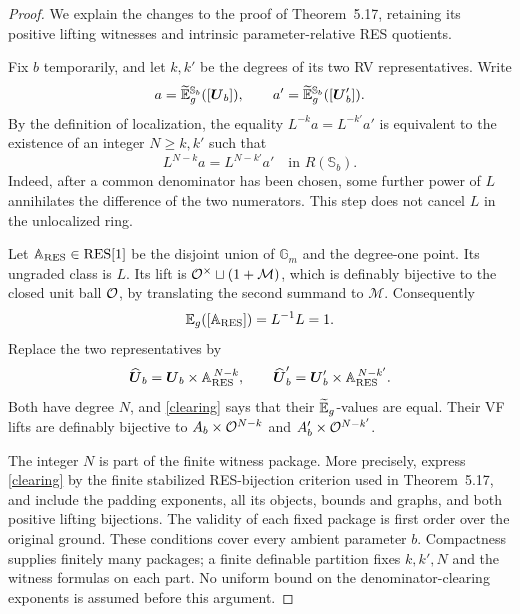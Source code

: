 \begin{proof}
We explain the changes to the proof of Theorem~5.17, retaining its
positive lifting witnesses and intrinsic parameter-relative RES quotients.

Fix $b$ temporarily, and let $k,k'$ be the degrees of its two RV
representatives. Write
\[
 a=\widetilde{\mathbb E}_g^{\mathbb S_b}([\boldsymbol{U}_b]),\qquad
 a'=\widetilde{\mathbb E}_g^{\mathbb S_b}([\boldsymbol{U}'_b]).
\]
By the definition of localization, the equality $L^{-k}a=L^{-k'}a'$
is equivalent to the existence of an integer $N\geq k,k'$ such that
\begin{equation}\label{clearing}
 L^{N-k}a=L^{N-k'}a'\quad\text{in }R(\mathbb S_b).
\end{equation}
Indeed, after a common denominator has been chosen, some further power
of $L$ annihilates the difference of the two numerators. This step does
not cancel $L$ in the unlocalized ring.

Let $\boldsymbol{\mathbb A}_{\mathrm{RES}}\in\mathrm{RES}[1]$ be the disjoint union of
$\mathbb G_m$ and the degree-one point. Its ungraded class is $L$.
Its lift is $\mathcal O^\times\sqcup(1+\mathcal M)$, which is definably
bijective to the closed unit ball $\mathcal O$, by translating the second
summand to $\mathcal M$. Consequently
\[
 \mathbb E_g([\boldsymbol{\mathbb A}_{\mathrm{RES}}])=L^{-1}L=1.
\]
Replace the two representatives by
\[
 \widehat{\boldsymbol{U}}_b=\boldsymbol{U}_b\times\boldsymbol{\mathbb A}_{\mathrm{RES}}^{\,N-k},
 \qquad
 \widehat{\boldsymbol{U}}'_b=\boldsymbol{U}'_b\times\boldsymbol{\mathbb A}_{\mathrm{RES}}^{\,N-k'}.
\]
Both have degree $N$, and \eqref{clearing} says that their $\widetilde{\mathbb E}_g$-values
are equal. Their VF lifts are definably bijective to
$A_b\times\mathcal O^{N-k}$ and $A'_b\times\mathcal O^{N-k'}$.

The integer $N$ is part of the finite witness package. More precisely,
express \eqref{clearing} by the finite stabilized RES-bijection criterion
used in Theorem~5.17, and include the padding exponents, all its objects,
bounds and graphs, and both positive lifting bijections. The validity of
each fixed package is first order over the original ground. These
conditions cover every ambient parameter $b$. Compactness supplies
finitely many packages; a finite definable partition fixes $k,k',N$ and
the witness formulas on each part. No uniform bound on the
denominator-clearing exponents is assumed before this argument.


\end{proof}
